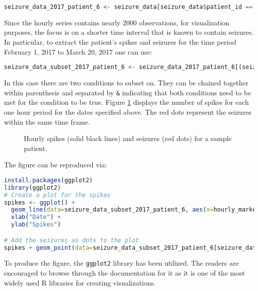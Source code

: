 \begin{lstlisting}[language=R]
seizure_data_2017_patient_6 <- seizure_data[seizure_data$patient_id == 'Patient_6', ]
\end{lstlisting}
Since the hourly series contains nearly 2000 observations, for visualization purposes, the focus is on a shorter time interval that is known to contain seizures. In particular, to extract the patient's spikes and seizures for the time period February 1, 2017 to March 20, 2017 one can use:
\begin{lstlisting}[language=R]
seizure_data_subset_2017_patient_6 <- seizure_data_2017_patient_6[(seizure_data_2017_patient_6$hourly_markers > '2017-02-01 00:00:00 UTC') & (seizure_data_2017_patient_6$hourly_markers <= '2017-03-20 00:00:00 UTC'),]
\end{lstlisting}
In this case there are two conditions to subset on. They can be chained together within parenthesis and separated by \verb|&| indicating that both conditions need to be met for the condition to be true.
Figure \ref{fig:time_seizure_spikes} displays the number of spikes for each one hour period for the dates specified above. The red dots represent the seizures within the same time frame.
\begin{figure}[H]
  \centering
  \caption{Hourly spikes (solid black lines) and seizures (red dots) for a sample patient.}
  \label{fig:time_seizure_spikes}
\end{figure}
The figure can be reproduced via:
\begin{lstlisting}[language=R]
install.packages(ggplot2)
library(ggplot2)
# Create a plot for the spikes
spikes <- ggplot() +
  geom_line(data=seizure_data_subset_2017_patient_6, aes(x=hourly_markers, y=iea_lead_agg)) +
  xlab("Date") +
  ylab("Spikes")

# Add the seizures as dots to the plot
spikes + geom_point(data=seizure_data_subset_2017_patient_6[seizure_data_subset_2017_patient_6$le > 0, ], aes(x=hourly_markers, y=iea_lead_agg), color='red')
\end{lstlisting}
To produce the figure, the \verb|ggplot2| \cite{ggplot2} library has been utilized. The readers are encouraged to browse through the documentation for it as it is one of the most widely used R libraries for creating visualizations.
